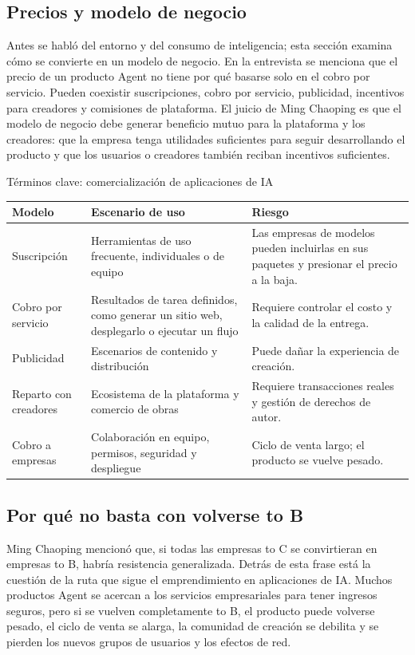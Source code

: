 \documentclass[a4paper]{article}
\begin{document}
\subsection{Precios y modelo de negocio}

Antes se habló del entorno y del consumo de inteligencia; esta sección examina cómo se convierte en un modelo de negocio. En la entrevista se menciona que el precio de un producto Agent no tiene por qué basarse solo en el cobro por servicio. Pueden coexistir suscripciones, cobro por servicio, publicidad, incentivos para creadores y comisiones de plataforma. El juicio de Ming Chaoping es que el modelo de negocio debe generar beneficio mutuo para la plataforma y los creadores: que la empresa tenga utilidades suficientes para seguir desarrollando el producto y que los usuarios o creadores también reciban incentivos suficientes.

\begin{knowledgebox}{Términos clave: comercialización de aplicaciones de IA}
\noindent\begin{tabularx}{\textwidth}{p{}p{}X}
\toprule
Modelo & Escenario de uso & Riesgo \\
\midrule
Suscripción & Herramientas de uso frecuente, individuales o de equipo & Las empresas de modelos pueden incluirlas en sus paquetes y presionar el precio a la baja. \\
Cobro por servicio & Resultados de tarea definidos, como generar un sitio web, desplegarlo o ejecutar un flujo & Requiere controlar el costo y la calidad de la entrega. \\
Publicidad & Escenarios de contenido y distribución & Puede dañar la experiencia de creación. \\
Reparto con creadores & Ecosistema de la plataforma y comercio de obras & Requiere transacciones reales y gestión de derechos de autor. \\
Cobro a empresas & Colaboración en equipo, permisos, seguridad y despliegue & Ciclo de venta largo; el producto se vuelve pesado. \\
\bottomrule
\end{tabularx}
\end{knowledgebox}

\subsection{Por qué no basta con volverse to B}

Ming Chaoping mencionó que, si todas las empresas to C se convirtieran en empresas to B, habría resistencia generalizada. Detrás de esta frase está la cuestión de la ruta que sigue el emprendimiento en aplicaciones de IA. Muchos productos Agent se acercan a los servicios empresariales para tener ingresos seguros, pero si se vuelven completamente to B, el producto puede volverse pesado, el ciclo de venta se alarga, la comunidad de creación se debilita y se pierden los nuevos grupos de usuarios y los efectos de red.
\end{document}
